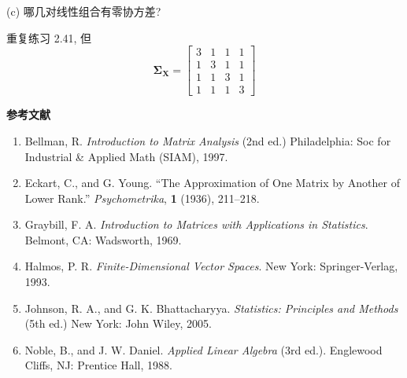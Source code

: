 \noindent (c) 哪几对线性组合有零协方差?

\medskip
{}\quad 重复练习 2.41, 但
\[
\boldsymbol{\Sigma}_{\mathbf{X}}=\begin{bmatrix}3&1&1&1\\1&3&1&1\\1&1&3&1\\1&1&1&3\end{bmatrix}
\]

\vspace{18pt}
\begin{center}
\label{bib:2}
{\large\bfseries 参考文献}
\end{center}
\vspace{4pt}

\begin{enumerate}[label=\arabic*.,leftmargin=*]
\item Bellman, R. \emph{Introduction to Matrix Analysis} (2nd ed.) Philadelphia: Soc for Industrial \& Applied Math (SIAM), 1997.
\item Eckart, C., and G. Young. ``The Approximation of One Matrix by Another of Lower Rank.'' \emph{Psychometrika}, \textbf{1} (1936), 211--218.
\item Graybill, F. A. \emph{Introduction to Matrices with Applications in Statistics}. Belmont, CA: Wadsworth, 1969.
\item Halmos, P. R. \emph{Finite-Dimensional Vector Spaces}. New York: Springer-Verlag, 1993.
\item Johnson, R. A., and G. K. Bhattacharyya. \emph{Statistics: Principles and Methods} (5th ed.) New York: John Wiley, 2005.
\item Noble, B., and J. W. Daniel. \emph{Applied Linear Algebra} (3rd ed.). Englewood Cliffs, NJ: Prentice Hall, 1988.
\end{enumerate}
